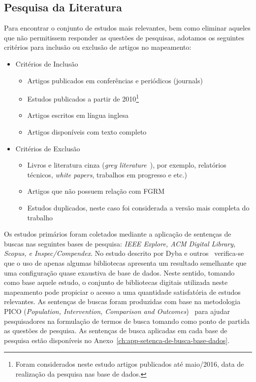 \subsection{Pesquisa da Literatura}
\label{subsec:map-pesquisa-literatura}

Para encontrar o conjunto de estudos mais relevantes, bem como eliminar aqueles
que não permitissem responder as questões de pesquisas, adotamos os seguintes
critérios para inclusão ou exclusão de artigos no mapeamento:

\begin{itemize}
	\item Critérios de Inclusão
		\begin{itemize}
			\item Artigos
				publicados em conferências e periódicos (journals)
			\item Estudos
				publicados a partir de 2010\footnote{Foram considerados neste
					estudo artigos publicados até maio/2016, data de realização
					da pesquisa nas base de dados.}
			\item Artigos escritos em
				língua inglesa
			\item Artigos disponíveis com texto
				completo
		\end{itemize}
	\item Critérios de Exclusão
		\begin{itemize}
            \item Livros e literatura cinza (\textit{grey
                  literature}~\cite{keele2007guidelines}), por exemplo,
                  relatórios técnicos, \textit{white papers}, trabalhos em
                  progresso e etc.)
             \item Artigos que não possuem relação com FGRM
			\item Estudos duplicados, neste caso foi considerada a versão mais
				completa do trabalho
		\end{itemize}
\end{itemize}

Os estudos primários foram coletados mediante a aplicação de sentenças de
buscas nas seguintes bases de pesquisa: \textit{IEEE Explore, ACM Digital
    Library, Scopus, e Inspec/Compendex}. No estudo descrito por Dyba e
outros~\cite{dybaa2007applying} verifica-se que o uso de apenas algumas
bibliotecas apresenta um resultado semelhante que uma configuração quase
exaustiva de base de dados. Neste sentido, tomando como base aquele estudo, o
conjunto de bibliotecas digitais utilizada neste mapeamento pode propiciar o
acesso a uma quantidade satisfatória de estudos relevantes. As sentenças de
buscas foram produzidas com base na metodologia PICO (\textit{Population,
    Intervention, Comparison and Outcomes})~\cite{keele2007guidelines} para
ajudar pesquisadores na formulação de termos de busca tomando como ponto de
partida as questões de pesquisa. As sentenças de busca aplicadas em cada base
de pesquisa estão disponíveis no
Anexo~\ref{ch:app-setenca-de-busca-base-dados}.

